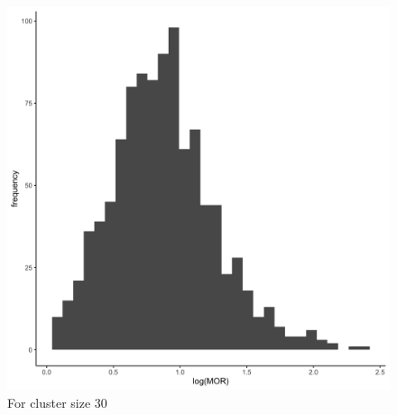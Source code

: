 \documentclass[
  letterpaper,
  DIV=11,
  numbers=noendperiod,
  titlepage]{scrartcl}
\begin{document}
\begin{figure}
\begin{minipage}[t]{0.50\linewidth}
{{\includegraphics{../../plots/two-lvl-ran-slope/low-prev/hist_10_30_two_lvl_slp_low_prev.png}

}

\caption{For cluster size 30}

}

\end{minipage}%
%
\begin{minipage}[t]{0.50\linewidth}

{\centering 

}
\end{minipage}
\end{figure}
\end{document}
